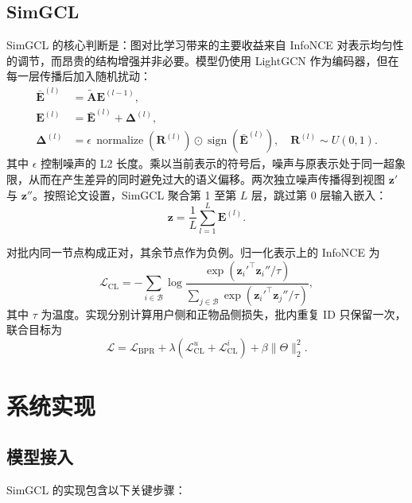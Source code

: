 \documentclass[UTF8,a4paper,12pt]{ctexart}
\begin{document}
\subsection{SimGCL}

SimGCL 的核心判断是：图对比学习带来的主要收益来自 InfoNCE 对表示均匀性的调节，而昂贵的结构增强并非必要。模型仍使用 LightGCN 作为编码器，但在每一层传播后加入随机扰动：
\begin{align}
  \bar{\mathbf E}^{(l)} &= \widetilde{\mathbf A}\mathbf E^{(l-1)},\\
  \mathbf E^{(l)} &= \bar{\mathbf E}^{(l)}+\boldsymbol\Delta^{(l)},\\
  \boldsymbol\Delta^{(l)}
  &=\epsilon\,\operatorname{normalize}(\mathbf R^{(l)})
  \odot\operatorname{sign}(\bar{\mathbf E}^{(l)}),
  \quad \mathbf R^{(l)}\sim U(0,1).
\end{align}
其中 $\epsilon$ 控制噪声的 L2 长度。乘以当前表示的符号后，噪声与原表示处于同一超象限，从而在产生差异的同时避免过大的语义偏移。两次独立噪声传播得到视图 $\mathbf z'$ 与 $\mathbf z''$。按照论文设置，SimGCL 聚合第 1 至第 $L$ 层，跳过第 0 层输入嵌入：
\begin{equation}
  \mathbf z=\frac{1}{L}\sum_{l=1}^{L}\mathbf E^{(l)}.
\end{equation}

对批内同一节点构成正对，其余节点作为负例。归一化表示上的 InfoNCE 为
\begin{equation}
  \mathcal L_{\mathrm{CL}}
  =-\sum_{i\in\mathcal B}
  \log\frac{\exp(\mathbf z_i'^{\top}\mathbf z_i''/\tau)}
  {\sum_{j\in\mathcal B}\exp(\mathbf z_i'^{\top}\mathbf z_j''/\tau)},
\end{equation}
其中 $\tau$ 为温度。实现分别计算用户侧和正物品侧损失，批内重复 ID 只保留一次，联合目标为
\begin{equation}
  \mathcal L
  =\mathcal L_{\mathrm{BPR}}
  +\lambda\left(\mathcal L_{\mathrm{CL}}^{u}
  +\mathcal L_{\mathrm{CL}}^{i}\right)
  +\beta\lVert\Theta\rVert_2^2.
\end{equation}

\section{系统实现}

\subsection{模型接入}

SimGCL 的实现包含以下关键步骤：
\end{document}
